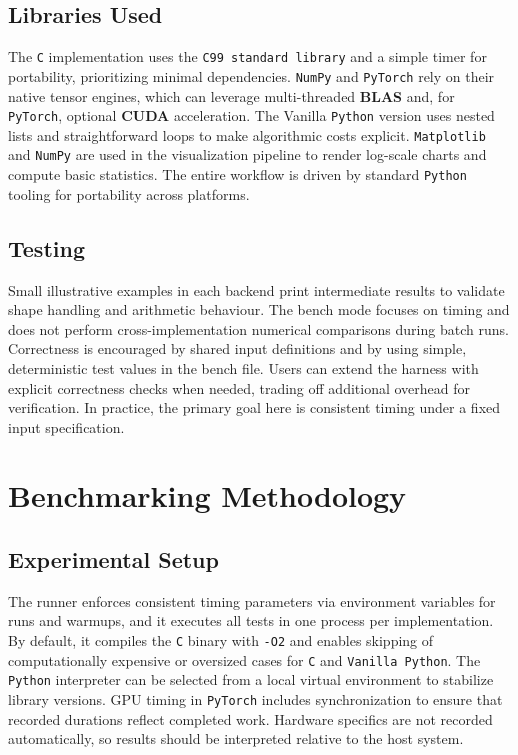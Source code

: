 \documentclass[a4paper,12pt]{article}
\begin{document}
\subsection{Libraries Used}
The \texttt{C} implementation uses the \texttt{C99 standard library} and a simple timer for portability, prioritizing minimal dependencies. \texttt{NumPy} and \texttt{PyTorch} rely on their native tensor engines, which can leverage multi-threaded \textbf{BLAS} and, for \texttt{PyTorch}, optional \textbf{CUDA} acceleration. The Vanilla \texttt{Python} version uses nested lists and straightforward loops to make algorithmic costs explicit. \texttt{Matplotlib} and \texttt{NumPy} are used in the visualization pipeline to render log-scale charts and compute basic statistics. The entire workflow is driven by standard \texttt{Python} tooling for portability across platforms.

\subsection{Testing}
Small illustrative examples in each backend print intermediate results to validate shape handling and arithmetic behaviour. The bench mode focuses on timing and does not perform cross-implementation numerical comparisons during batch runs. Correctness is encouraged by shared input definitions and by using simple, deterministic test values in the bench file. Users can extend the harness with explicit correctness checks when needed, trading off additional overhead for verification. In practice, the primary goal here is consistent timing under a fixed input specification.

\section{Benchmarking Methodology}
\subsection{Experimental Setup}
The runner enforces consistent timing parameters via environment variables for runs and warmups, and it executes all tests in one process per implementation. By default, it compiles the \texttt{C} binary with \texttt{-O2} and enables skipping of computationally expensive or oversized cases for \texttt{C} and \texttt{Vanilla Python}. The \texttt{Python} interpreter can be selected from a local virtual environment to stabilize library versions. GPU timing in \texttt{PyTorch} includes synchronization to ensure that recorded durations reflect completed work. Hardware specifics are not recorded automatically, so results should be interpreted relative to the host system.
\end{document}
